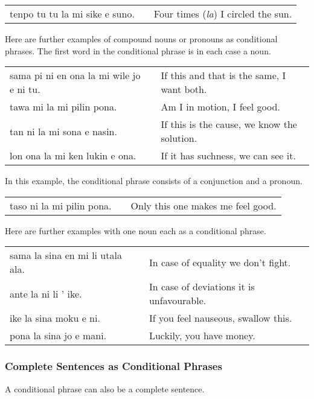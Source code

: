 \begin{supertabular}{p{5,5cm}|ll}
tenpo tu tu la mi sike e suno. && Four times (\textit{la}) I circled the sun. \\
\end{supertabular} 

Here are further examples of compound nouns or pronouns as conditional phrases. 
The first word in the conditional phrase is in each case a noun.

\begin{supertabular}{p{5,5cm}|ll}
sama pi ni en ona la mi wile jo e ni tu. &&  If this and that is the same, I want both.\\
tawa mi la mi pilin pona. && Am I in motion, I feel good. \\
tan ni la mi sona e nasin. && If this is the cause, we know the solution. \\
lon ona la mi ken lukin e ona. && If it has suchness, we can see it. \\
\end{supertabular} 

In this example, the conditional phrase consists of a conjunction and a pronoun. 

\begin{supertabular}{p{5,5cm}|ll}
taso ni la mi pilin pona. && Only this one makes me feel good. \\
\end{supertabular} 

Here are further examples with one noun each as a conditional phrase.

\begin{supertabular}{p{5,5cm}|ll}
sama la sina en mi li utala ala. && In case of equality we don't fight. \\
ante la ni li ' ike. && In case of deviations it is unfavourable.  \\
ike la sina moku e ni. && If you feel nauseous, swallow this. \\
pona la sina jo e mani. && Luckily, you have money. \\
\end{supertabular} 

%
%
\subsubsection*{Complete Sentences as Conditional Phrases}
%
%
A conditional phrase can also be a complete sentence.


